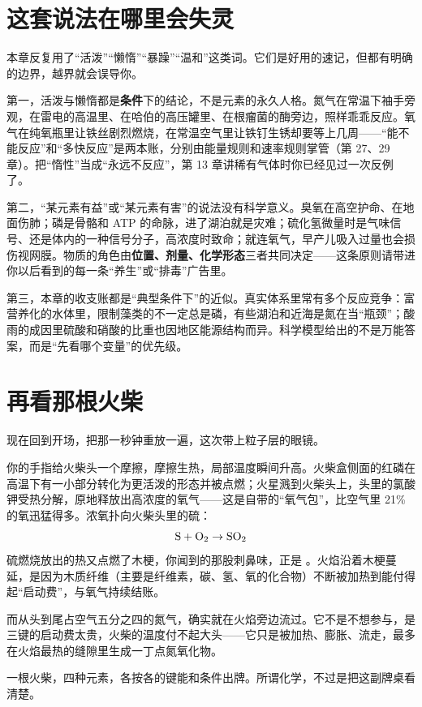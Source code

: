 \section{这套说法在哪里会失灵}

本章反复用了“活泼”“懒惰”“暴躁”“温和”这类词。它们是好用的速记，但都有明确的边界，越界就会误导你。

第一，活泼与懒惰都是\textbf{条件}下的结论，不是元素的永久人格。氮气在常温下袖手旁观，在雷电的高温里、在哈伯的高压罐里、在根瘤菌的酶旁边，照样乖乖反应。氧气在纯氧瓶里让铁丝剧烈燃烧，在常温空气里让铁钉生锈却要等上几周——“能不能反应”和“多快反应”是两本账，分别由能量规则和速率规则掌管（第 27、29 章）。把“惰性”当成“永远不反应”，第 13 章讲稀有气体时你已经见过一次反例了。

第二，“某元素有益”或“某元素有害”的说法没有科学意义。臭氧在高空护命、在地面伤肺；磷是骨骼和 ATP 的命脉，进了湖泊就是灾难；硫化氢微量时是气味信号、还是体内的一种信号分子，高浓度时致命；就连氧气，早产儿吸入过量也会损伤视网膜。物质的角色由\textbf{位置、剂量、化学形态}三者共同决定——这条原则请带进你以后看到的每一条“养生”或“排毒”广告里。

第三，本章的收支账都是“典型条件下”的近似。真实体系里常有多个反应竞争：富营养化的水体里，限制藻类的不一定总是磷，有些湖泊和近海是氮在当“瓶颈”；酸雨的成因里硫酸和硝酸的比重也因地区能源结构而异。科学模型给出的不是万能答案，而是“先看哪个变量”的优先级。

\section{再看那根火柴}

现在回到开场，把那一秒钟重放一遍，这次带上粒子层的眼镜。

你的手指给火柴头一个摩擦，摩擦生热，局部温度瞬间升高。火柴盒侧面的红磷在高温下有一小部分转化为更活泼的形态并被点燃；火星溅到火柴头上，头里的氯酸钾受热分解，原地释放出高浓度的氧气——这是自带的“氧气包”，比空气里 21\% 的氧迅猛得多。浓氧扑向火柴头里的硫：
\[\mathrm{S} + \mathrm{O_2} \rightarrow \mathrm{SO_2}\]
硫燃烧放出的热又点燃了木梗，你闻到的那股刺鼻味，正是 。火焰沿着木梗蔓延，是因为木质纤维（主要是纤维素，碳、氢、氧的化合物）不断被加热到能付得起“启动费”，与氧气持续结账。

而从头到尾占空气五分之四的氮气，确实就在火焰旁边流过。它不是不想参与，是三键的启动费太贵，火柴的温度付不起大头——它只是被加热、膨胀、流走，最多在火焰最热的缝隙里生成一丁点氮氧化物。

一根火柴，四种元素，各按各的键能和条件出牌。所谓化学，不过是把这副牌桌看清楚。

